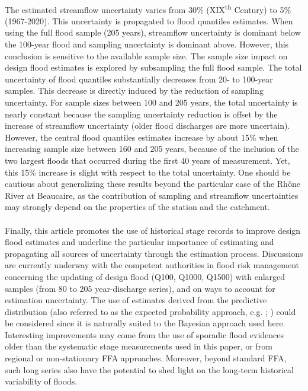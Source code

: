     \paragraph{} The estimated streamflow uncertainty varies from 30\% (XIX\textsuperscript{th} Century) to 5\% (1967-2020). This uncertainty is propagated to flood quantiles estimates. When using the full flood sample (205 years), streamflow uncertainty is dominant below the 100-year flood and sampling uncertainty is dominant above. However, this conclusion is sensitive to the available sample size. The sample size impact on design flood estimates is explored by subsampling the full flood sample.
    The total uncertainty of flood quantiles substantially decreases from 20- to 100-year samples. This decrease is directly induced by the reduction of sampling uncertainty. For sample sizes between 100 and 205 years, the total uncertainty is nearly constant because the sampling uncertainty reduction is offset by the increase of streamflow uncertainty (older flood discharges are more uncertain). However, the central flood quantiles estimates increase by about 15\% when increasing sample size between 160 and 205 years, because of the inclusion of the two largest floods that occurred during the first 40 years of measurement. Yet, this 15\% increase is slight with respect to the total uncertainty. One should be cautious about generalizing these results beyond the particular case of the Rhône River at Beaucaire, as the contribution of sampling and streamflow uncertainties may strongly depend on the properties of the station and the catchment.
    \paragraph{}
    Finally, this article promotes the use of historical stage records to improve design flood estimates and underline the particular importance of estimating and propagating all sources of uncertainty through the estimation process. Discussions are currently underway with the competent authorities in flood risk management concerning the updating of design flood (Q100, Q1000, Q1500) with enlarged samples (from 80 to 205 year-discharge series), and on ways to account for estimation uncertainty. The use of estimates derived from the predictive distribution (also referred to as the expected probability approach, e.g. \cite{kuczera_comprehensive_1999}; \cite{renard_data-based_2013}) could be considered since it is naturally suited to the Bayesian approach used here. Interesting improvements may come from the use of sporadic flood evidences older than the systematic stage measurements used in this paper, or from regional or non-stationary FFA approaches. Moreover, beyond standard FFA, such long series also have the potential to shed light on the long-term historical variability of floods. 

